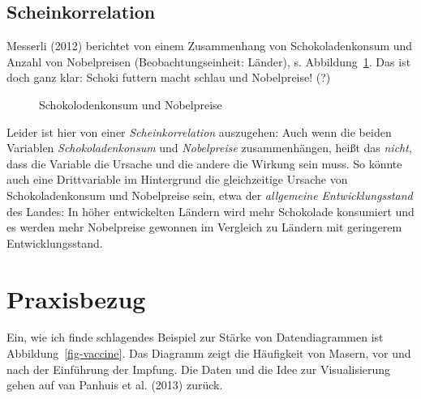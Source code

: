 \documentclass[
  letterpaper,
]{scrbook}
\theoremstyle{definition}
\theoremstyle{definition}
\theoremstyle{definition}
\theoremstyle{remark}
\begin{document}
\subsection{Scheinkorrelation}\label{scheinkorrelation}

Messerli (2012) berichtet von einem Zusammenhang von Schokoladenkonsum
und Anzahl von Nobelpreisen (Beobachtungseinheit: Länder), s.
Abbildung~\ref{fig-choc}. Das ist doch ganz klar: Schoki futtern macht
schlau und Nobelpreise! (?)

\begin{figure}


\caption{\label{fig-choc}Schokolodenkonsum und Nobelpreise}

\end{figure}%

Leider ist hier von einer \emph{Scheinkorrelation} auszugehen: Auch wenn
die beiden Variablen \emph{Schokoladenkonsum} und \emph{Nobelpreise}
zusammenhängen, heißt das \emph{nicht}, dass die Variable die Ursache
und die andere die Wirkung sein muss. So könnte auch eine Drittvariable
im Hintergrund die gleichzeitige Ursache von Schokoladenkonsum und
Nobelpreise sein, etwa der \emph{allgemeine Entwicklungsstand} des
Landes: In höher entwickelten Ländern wird mehr Schokolade konsumiert
und es werden mehr Nobelpreise gewonnen im Vergleich zu Ländern mit
geringerem Entwicklungsstand.

\section{Praxisbezug}\label{praxisbezug-3}

Ein, wie ich finde schlagendes Beispiel zur Stärke von Datendiagrammen
ist Abbildung~\ref{fig-vaccine}. Das Diagramm zeigt die Häufigkeit von
Masern, vor und nach der Einführung der Impfung. Die Daten und die Idee
zur Visualisierung gehen auf van Panhuis et al. (2013) zurück.
\end{document}
